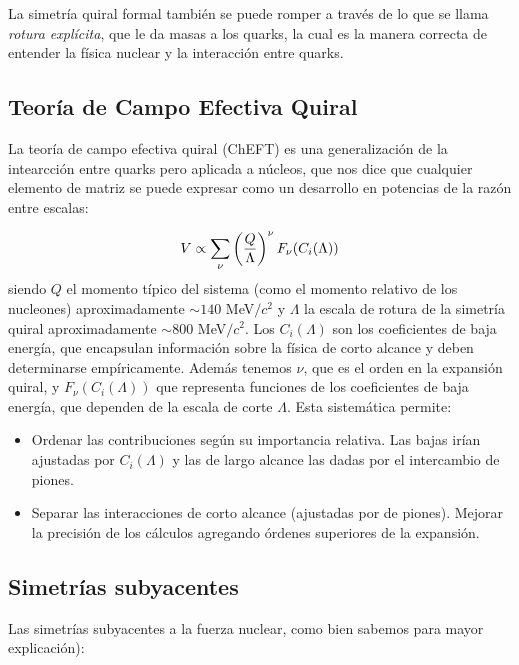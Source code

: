 La simetría quiral formal también se puede romper a través de lo que se llama \textit{rotura explícita}, que le da masas a los quarks, la cual es la manera correcta de entender la física nuclear y la interacción entre quarks. 

\subsection{Teoría de Campo Efectiva Quiral}

La teoría de campo efectiva quiral (ChEFT) es una generalización de la intearcción entre quarks pero aplicada a núcleos, que nos dice que cualquier elemento de matriz se puede expresar como un desarrollo en potencias de la razón entre escalas:

\begin{equation}
    V \propto \sum_\nu \left( \frac{Q}{\Lambda} \right)^\nu F_\nu (C_i(\Lambda))
\end{equation}
siendo $Q$ el momento típico del sistema (como el momento relativo de los nucleones) aproximadamente $\sim 140$ MeV$/c^2$ y $\Lambda$ la escala de rotura de la simetría quiral aproximadamente  $\sim 800$ MeV$/c^2$. Los $C_i (\Lambda)$ son los coeficientes de baja energía, que encapsulan información sobre la física de corto alcance y deben determinarse empíricamente. Además tenemos $\nu$, que es el orden en la expansión quiral, y $F_\nu(C_i(\Lambda))$  que  representa funciones de los coeficientes de baja energía, que dependen de la escala de corte $\Lambda$. Esta sistemática permite:
\begin{itemize}
    \item Ordenar las contribuciones según su importancia relativa. Las bajas irían ajustadas por $C_i(\Lambda)$ y las de largo alcance las dadas por el intercambio de piones.
    \item Separar las interacciones de corto alcance (ajustadas por de piones). Mejorar la precisión de los cálculos agregando órdenes superiores de la expansión.
\end{itemize}
\subsection{Simetrías subyacentes} \label{Subsec:02-01-03}

Las simetrías subyacentes a la fuerza nuclear, como bien sabemos para mayor explicación): 

